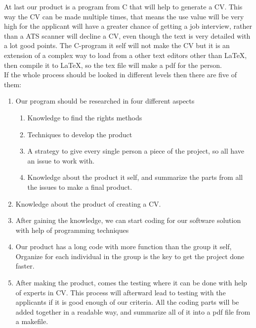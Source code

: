 At last our product is a program from C that will help to generate a CV. This way the CV can be made multiple times,
that means the use value will be very high for the applicant will have a greater chance of getting a job interview,
rather than a ATS scanner will decline a CV, even though the text is very detailed with a lot good points.
The C-program it self will not make the CV but it is an extension of a complex way to load from a other text editors
other than LaTeX, then compile it to LaTeX, so the tex file will make a pdf for the person.\\

If the whole process should be looked in different levels then there are five of them:

\begin{enumerate}
  \item Our program should be researched in four different aspects 
  \begin{enumerate}
    \item Knowledge to find the rights methods 
    \item Techniques to develop the product
    \item A strategy to give every single person a piece of the project, so all have an issue to work with.
    \item Knowledge about the product it self, and summarize the parts from all the issues to make a final product.
  \end{enumerate}
  \item Knowledge about the product of creating a CV.
  \item After gaining the knowledge,
        we can start coding for our software solution with help of programming techniques
  \item Our product has a long code with more function than the group it self, 
        Organize for each individual in the group is the key to get the project done faster.
  \item After making the product, comes the testing where it can be done with help of experts in CV.
        This process will afterward lead to testing with the applicants if it is good enough of our criteria.
        All the coding parts will be added together in a readable way, and summarize all of it into a pdf file from a makefile.
\end{enumerate}